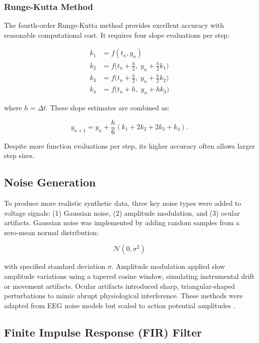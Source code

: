     \subsubsection{Runge-Kutta Method}
    \label{subsubsec:runge-kutta}

        The fourth-order Runge-Kutta method provides excellent accuracy with reasonable computational cost.  
        It requires four slope evaluations per step:

        \[
        \begin{aligned}
        k_1 &= f(t_n, y_n) \\[3pt]
        k_2 &= f\bigl(t_n + \tfrac{h}{2},\; y_n + \tfrac{h}{2}k_1\bigr) \\[3pt]
        k_3 &= f\bigl(t_n + \tfrac{h}{2},\; y_n + \tfrac{h}{2}k_2\bigr) \\[3pt]
        k_4 &= f\bigl(t_n + h,\; y_n + h k_3\bigr)
        \end{aligned}
        \]

        where $h = \Delta t$.  
        These slope estimates are combined as:

        \[
        y_{n+1} = y_n + \frac{h}{6}(k_1 + 2k_2 + 2k_3 + k_4).
        \]

        Despite more function evaluations per step, its higher accuracy often allows larger step sizes.

\subsection{Noise Generation}
\label{subsection:noise-generation}

    To produce more realistic synthetic data, three key noise types were added to voltage signals: (1) Gaussian noise, (2) amplitude modulation, and (3) ocular artifacts.  
    Gaussian noise was implemented by adding random samples from a zero-mean normal distribution:

    \[
    \mathcal{N}(0, \sigma^2)
    \]

    with specified standard deviation $\sigma$.  
    Amplitude modulation applied slow amplitude variations using a tapered cosine window, simulating instrumental drift or movement artifacts.  
    Ocular artifacts introduced sharp, triangular-shaped perturbations to mimic abrupt physiological interference.  
    These methods were adapted from EEG noise models but scaled to action potential amplitudes \citep{SEREEGA2018}.

\subsection{Finite Impulse Response (FIR) Filter}
\label{subsection:fir-filter}

